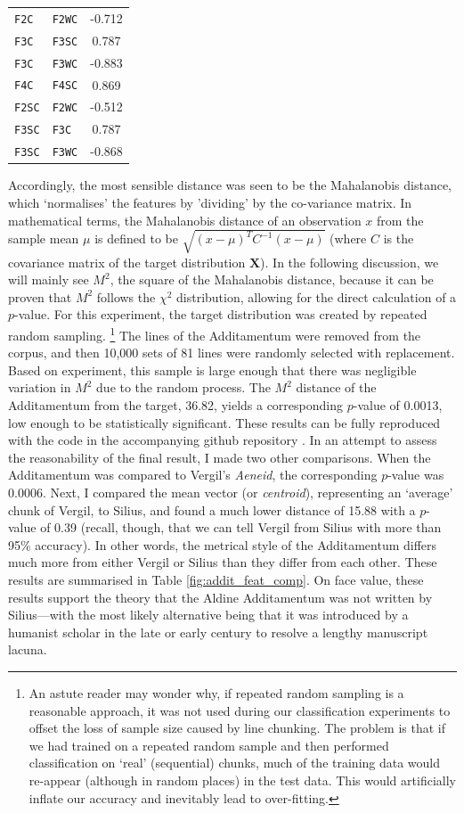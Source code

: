 \documentclass[11pt,a4paper]{scrartcl} %
\begin{document}
{\begin{table}
{\begin{tabular}{ | l | l | c |}
\texttt{F2C} & \texttt{F2WC} & -0.712 \\
\texttt{F3C} & \texttt{F3SC} & 0.787 \\
\texttt{F3C} & \texttt{F3WC} & -0.883 \\
\texttt{F4C} & \texttt{F4SC} & 0.869 \\
\texttt{F2SC} & \texttt{F2WC} & -0.512 \\
\texttt{F3SC} & \texttt{F3C} & 0.787 \\
\texttt{F3SC} & \texttt{F3WC} & -0.868 \\
\hline
\end{tabular}}
\end{table}
Accordingly, the most sensible distance was seen to be the Mahalanobis distance, which `normalises' the features by 'dividing' by the co-variance matrix. In mathematical terms, the Mahalanobis distance of an observation $x$ from the sample mean $\mu$ is defined to be $\sqrt{(x-\mu)^{T}C^{-1}(x-\mu)}$ (where $C$ is the covariance matrix of the target distribution $\textbf{X}$). In the following discussion, we will mainly see $M^{2}$, the square of the Mahalanobis distance, because it can be proven that $M^{2}$ follows the $\chi^{2}$ distribution, allowing for the direct calculation of a $p$-value. For this experiment, the target distribution was created by repeated random sampling.%
\footnote{An astute reader may wonder why, if repeated random sampling is a reasonable approach, it was not used during our classification experiments to offset the loss of sample size caused by line chunking. The problem is that if we had trained on a repeated random sample and then performed classification on `real' (sequential) chunks, much of the training data would re-appear (although in random places) in the test data. This would artificially inflate our accuracy and inevitably lead to over-fitting.}
The lines of the Additamentum were removed from the corpus, and then 10,000 sets of 81 lines were randomly selected with replacement. Based on experiment, this sample is large enough that there was negligible variation in $M^{2}$ due to the random process. The $M^{2}$ distance of the Additamentum from the target, 36.82, yields a corresponding $p$-value of 0.0013, low enough to be statistically significant. These results can be fully reproduced with the code in the accompanying github repository \cite{nagy_hexml_2019}. In an attempt to assess the reasonability of the final result, I made two other comparisons. When the Additamentum was compared to Vergil's \textit{Aeneid}, the corresponding $p$-value was 0.0006. Next, I compared the mean vector (or \textit{centroid}), representing an `average' chunk of Vergil, to Silius, and found a much lower distance of 15.88 with a $p$-value of 0.39 (recall, though, that we can tell Vergil from Silius with more than 95\% accuracy). In other words, the metrical style of the Additamentum differs much more from either Vergil or Silius than they differ from each other. These results are summarised in Table \ref{fig:addit_feat_comp}. On face value, these results support the theory that the Aldine Additamentum was not written by Silius---with the most likely alternative being that it was introduced by a humanist scholar in the late  or early  century to resolve a lengthy manuscript lacuna.%
}
\end{document}
